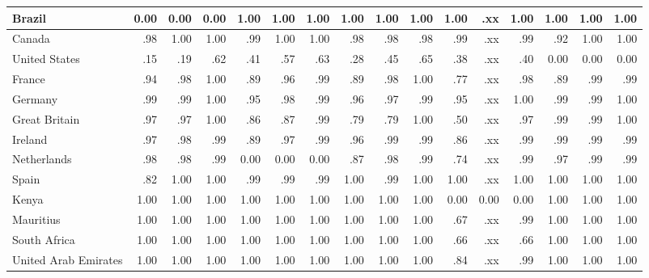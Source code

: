 \begin{table*}[t]
{\begin{tabular}{P{32mm}|d{3.2}d{3.2}d{3.2}|d{3.2}d{3.2}d{3.2}|d{3.2}d{3.2}d{3.2}|d{3.2}d{3.2}d{3.2}|d{3.2}d{3.2}d{3.2}}
Brazil               &0.00  &0.00   &0.00     &1.00 &1.00 &1.00   &1.00  &1.00  &1.00   &1.00 &.xx  &1.00  &1.00 &1.00 &1.00  \\ \midrule
Canada               &.98  &1.00   &1.00     &.99 &1.00 &1.00   &.98  &.98  &.98  &.99 &.xx  &.99  &.92 &1.00  &1.00  \\
United States        &.15  &.19   &.62     &.41  &.57 &.63   &.28  &.45  &.65  &.38 &.xx  &.40  &0.00  &0.00 &0.00  \\ \midrule
France               &.94   &.98  &1.00     &.89 &.96 &.99   &.89  &.98  &1.00  &.77 &.xx  &.98  &.89 &.99 &.99  \\
Germany              &.99  &.99   &1.00     &.95 &.98 &.99   &.96  &.97  &.99  &.95 &.xx  &1.00  &.99 &.99 &1.00  \\
Great Britain        &.97  &.97   &1.00     &.86 &.87 &.99   &.79  &.79  &1.00  &.50 &.xx  &.97  &.99 &.99 &1.00  \\
Ireland              &.97   &.98  &.99     &.89 &.97 &.99   &.96 &.99   &.99  &.86 &.xx  &.99  &.99 &.99 &.99  \\
Netherlands          &.98  &.98   &.99     &0.00 &0.00 &0.00   &.87  &.98  &.99  &.74  &.xx &.99  &.97 &.99 &.99  \\
Spain                &.82  &1.00   &1.00     &.99 &.99 &.99   &1.00  &.99  &1.00  &1.00  &.xx &1.00  &1.00 &1.00  &1.00  \\ \midrule
Kenya                &1.00  &1.00   &1.00     &1.00 &1.00 &1.00   &1.00  &1.00  &1.00  &0.00 &0.00  &0.00  &1.00 &1.00  &1.00  \\
Mauritius            &1.00  &1.00   &1.00     &1.00 &1.00 &1.00   &1.00  &1.00  &1.00  &.67 &.xx  &.99  &1.00 &1.00 &1.00  \\
South Africa         &1.00  &1.00   &1.00     &1.00 &1.00 &1.00   &1.00 &1.00   &1.00  &.66 &.xx  &.66  &1.00 &1.00 &1.00  \\ \midrule
United Arab Emirates &1.00  &1.00   &1.00     &1.00 &1.00 &1.00   &1.00 &1.00   &1.00  &.84 &.xx  &.99  &1.00 &1.00 &1.00  \\

\end{tabular}}
\end{table*}

